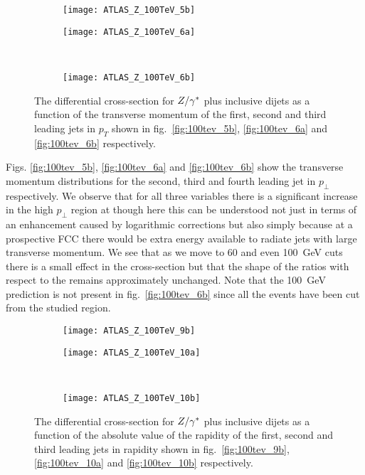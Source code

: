 	\begin{figure}[bth]
		\centering
		\begin{subfigure}[b]{0.48\textwidth}
			\texttt{[image: ATLAS\_Z\_100TeV\_5b]}
			\caption{}
			\label{fig:100tev_5b}
		\end{subfigure}

		\begin{subfigure}[b]{0.48\textwidth}
			\texttt{[image: ATLAS\_Z\_100TeV\_6a]}
			\caption{}
			\label{fig:100tev_6a}
		\end{subfigure}
		~
		\begin{subfigure}[b]{0.48\textwidth}
			\texttt{[image: ATLAS\_Z\_100TeV\_6b]}
			\caption{}
			\label{fig:100tev_6b}
		\end{subfigure}
		\caption{The differential cross-section for $Z/\gamma^*$ plus inclusive dijets as a function of the transverse momentum
		         of the first, second and third leading jets in $p_T$ shown in fig.~\eqref{fig:100tev_5b}, \eqref{fig:100tev_6a}
		         and \eqref{fig:100tev_6b} respectively.}
	\end{figure}

	Figs. \eqref{fig:100tev_5b}, \eqref{fig:100tev_6a} and \eqref{fig:100tev_6b} show the transverse momentum
	distributions for the second, third and fourth leading jet in $p_\perp$ respectively.  We observe that for all three
	variables there is a significant increase in the high $p_\perp$ region at \htev though here this can be understood
	not just in terms of an enhancement caused by logarithmic corrections but also simply because at a prospective FCC
	there would be extra energy available to radiate jets with large transverse momentum.  We see that as we move to
	60 and even 100~GeV cuts there is a small effect in the cross-section but that the shape of the ratios with respect
	to the \stev remains approximately unchanged.  Note that the 100~GeV prediction is not present in
	fig.~\eqref{fig:100tev_6b} since all the events have been cut from the studied region.

	\begin{figure}[bth]
		\centering
		\begin{subfigure}[b]{0.48\textwidth}
			\texttt{[image: ATLAS\_Z\_100TeV\_9b]}
			\caption{}
			\label{fig:100tev_9b}
		\end{subfigure}

		\begin{subfigure}[b]{0.48\textwidth}
			\texttt{[image: ATLAS\_Z\_100TeV\_10a]}
			\caption{}
			\label{fig:100tev_10a}
		\end{subfigure}
		~
		\begin{subfigure}[b]{0.48\textwidth}
			\texttt{[image: ATLAS\_Z\_100TeV\_10b]}
			\caption{}
			\label{fig:100tev_10b}
		\end{subfigure}
		\caption{The differential cross-section for $Z/\gamma^*$ plus inclusive dijets as a function of the absolute value of the rapidity
		         of the first, second and third leading jets in rapidity shown in fig.~\eqref{fig:100tev_9b}, \eqref{fig:100tev_10a}
		         and \eqref{fig:100tev_10b} respectively.}
	\end{figure}

